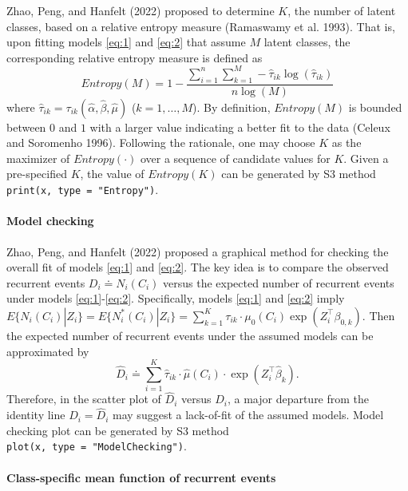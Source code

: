 Zhao, Peng, and Hanfelt (2022) proposed to determine \(K\), the number of latent classes, based on a relative entropy measure
(Ramaswamy et al. 1993). That is, upon fitting models \eqref{eq:1} and \eqref{eq:2} that assume \(M\) latent classes, the corresponding relative entropy measure is defined as
\begin{equation} 
\label{eq:15}
Entropy(M) = 1 - \frac{\sum _{i = 1} ^{n} \sum _{k = 1} ^{M} - \hat{\tau} _{ik} \log(\hat{\tau} _{ik})}{n \log(M)} 
\end{equation}
where
\(\hat{\tau} _{ik} = \tau _{ik} (\hat{\alpha}, \hat{\beta}, \hat{\mu})\) (\(k=1,\ldots, M\)).
By definition, \(Entropy(M)\) is bounded between \(0\) and \(1\) with a larger value
indicating a better fit to the data (Celeux and Soromenho 1996). Following the rationale, one may choose \(K\) as the maximizer of \(Entropy(\cdot)\) over a sequence of candidate values for \(K\).
Given a pre-specified \(K\), the value of \(Entropy(K)\) can be generated by S3 method \texttt{print(x,\ type\ =\ "Entropy")}.

\hypertarget{model-checking}{%
\paragraph{Model checking}\label{model-checking}}

Zhao, Peng, and Hanfelt (2022) proposed a graphical method for checking the overall fit of models \eqref{eq:1} and \eqref{eq:2}. The key idea is to compare the
observed recurrent events \(D_i \doteq N_i(C_i)\) versus the expected number of recurrent events under models \eqref{eq:1}-\eqref{eq:2}. Specifically, models \eqref{eq:1} and \eqref{eq:2} imply
\(E \{ N_{i} (C_i) | Z_i \} = E \{ N_{i} ^{*} (C_i) | Z_i \} = \sum _{k = 1} ^{K} \tau _{ik} \cdot \mu _{0} (C_i) \exp (Z_{i} ^{\top} \beta _{0, k}).\)
Then the expected number of recurrent events under the assumed models can be approximated by
\begin{equation} 
\label{eq:16}
\hat{D}_i \doteq \sum_{i = 1} ^{K} \hat{\tau} _{ik} \cdot \hat{\mu}(C_i) \cdot \exp(Z_{i} ^{\top} \hat{\beta}_k ).
\end{equation}
Therefore, in the scatter plot of \(\hat D_i\) versus \({D} _i\), a major departure
from the identity line \(D_i = \hat{D} _i\) may suggest a lack-of-fit of the assumed models.
Model checking plot can be generated by S3 method \texttt{plot(x,\ type\ =\ "ModelChecking")}.

\hypertarget{class-specific-mean-function-of-recurrent-events}{%
\paragraph{Class-specific mean function of recurrent events}\label{class-specific-mean-function-of-recurrent-events}}

